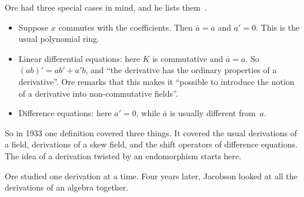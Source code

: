 Ore had three special cases in mind, and he lists them~\cite[p.~482]{Ore1933}.
\begin{itemize}
\item Suppose $x$ commutes with the coefficients. Then $\bar a = a$ and
  $a' = 0$. This is the usual polynomial ring.
\item Linear differential equations: here $K$ is commutative and
  $\bar a = a$. So $(ab)' = ab' + a'b$, and ``the derivative has the ordinary
  properties of a derivative''. Ore remarks that this makes it ``possible to
  introduce the notion of a derivative into non-commutative fields''.
\item Difference equations: here $a' = 0$, while $\bar a$ is usually
  different from~$a$.
\end{itemize}

So in 1933 one definition covered three things. It covered the usual
derivations of a field, derivations of a skew field, and the shift operators
of difference equations. The idea of a derivation twisted by an endomorphism
starts here.

Ore studied one derivation at a time. Four years later, Jacobson looked at
all the derivations of an algebra together.
